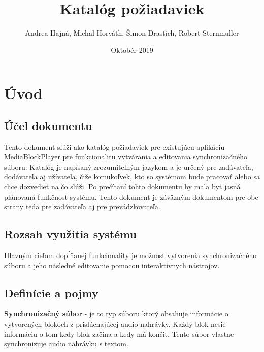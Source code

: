 \documentclass{article}
\title{Katalóg požiadaviek}
\author{Andrea Hajná, Michal Horváth, Šimon Drastich, Robert Sternmuller}
\date{Oktobér 2019}
\begin{document}

\maketitle %

\newpage


\tableofcontents

\newpage


\section{Úvod}

\subsection{Účel dokumentu }
 Tento dokument slúži ako katalóg požiadaviek pre existujúcu aplikáciu MediaBlockPlayer pre funkcionalitu vytvárania a editovania synchronizačného súboru. Katalóg je napísaný zrozumiteľným jazykom a je určený pre zadávateľa, dodávateľa aj užívateľa, čiže komukoľvek, kto so systémom bude pracovať alebo sa chce dozvedieť na čo slúži. Po prečítaní tohto dokumentu by mala byť jasná plánovaná funkčnosť systému.
Tento dokument je záväzným dokumentom pre obe strany teda pre zadávateľa aj pre prevádzkovateľa.

\subsection{Rozsah využitia systému}
Hlavným cieľom dopĺňanej funkcionality je možnosť vytvorenia synchronizačného súboru a jeho následné editovanie pomocou interaktívnych nástrojov.

\subsection{Definície a pojmy}
\textbf{Synchronizačný súbor} - je to typ súboru ktorý obsahuje informácie o vytvorených blokoch z prislúchajúcej audio nahrávky. Každý blok nesie informáciu o tom kedy blok začína a kedy má končiť. Tento súbor vlastne synchronizuje audio nahrávku s textom.
\end{document}
